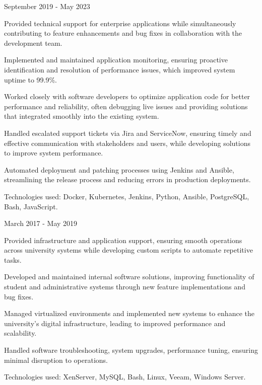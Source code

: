  {September 2019 - May 2023}
\begin{resume_list}
    \item Provided technical support for enterprise applications while simultaneously contributing to feature enhancements and bug fixes in collaboration with the development team.
    \item Implemented and maintained application monitoring, ensuring proactive identification and resolution of performance issues, which improved system uptime to 99.9\%.
    \item Worked closely with software developers to optimize application code for better performance and reliability, often debugging live issues and providing solutions that integrated smoothly into the existing system.
    \item Handled escalated support tickets via Jira and ServiceNow, ensuring timely and effective communication with stakeholders and users, while developing solutions to improve system performance.
    \item Automated deployment and patching processes using Jenkins and Ansible, streamlining the release process and reducing errors in production deployments.
    \item Technologies used: Docker, Kubernetes, Jenkins, Python, Ansible, PostgreSQL, Bash, JavaScript.
\end{resume_list}

 {March 2017 - May 2019}
\begin{resume_list}
    \item Provided infrastructure and application support, ensuring smooth operations across university systems while developing custom scripts to automate repetitive tasks.
    \item Developed and maintained internal software solutions, improving functionality of student and administrative systems through new feature implementations and bug fixes.
    \item Managed virtualized environments and implemented new systems to enhance the university’s digital infrastructure, leading to improved performance and scalability.
    \item Handled software troubleshooting, system upgrades, performance tuning, ensuring minimal disruption to operations.
    \item Technologies used: XenServer, MySQL, Bash, Linux, Veeam, Windows Server.
\end{resume_list}
